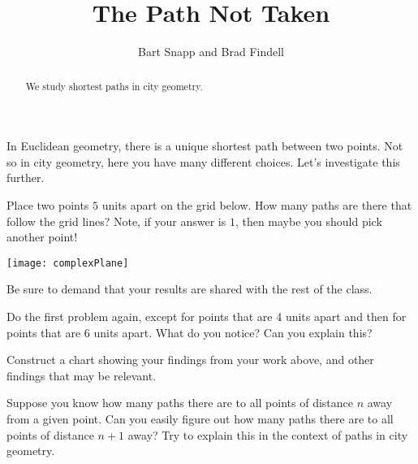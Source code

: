 \documentclass[nooutcomes]{ximera}
\title{The Path Not Taken}
\author{Bart Snapp and Brad Findell}
\begin{document}
\begin{abstract}
We study shortest paths in city geometry.
\end{abstract}
\maketitle


In Euclidean geometry, there is a unique shortest path between two
points. Not so in city geometry, here you have many different
choices. Let's investigate this further.


\begin{problem} 
Place two points $5$ units apart on the grid below. How many paths are
there that follow the grid lines? Note, if your answer is $1$, then
maybe you should pick another point!
\begin{image}
\texttt{[image: complexPlane]}
\end{image}
Be sure to demand that your results are shared with the rest of the
class.
\end{problem}

\newpage

\begin{problem}
Do the first problem again, except for points that are 4 units apart
and then for points that are 6 units apart. What do you notice? Can
you explain this?
\vfill
\end{problem}

\begin{problem}
Construct a chart showing your findings from your work above, and
other findings that may be relevant.
\vfill
\end{problem}

\begin{problem}
Suppose you know how many paths there are to all points of distance
$n$ away from a given point. Can you easily figure out how many paths
there are to all points of distance $n+1$ away? Try to explain this in
the context of paths in city geometry.
\vfill
\end{problem}
\end{document}
